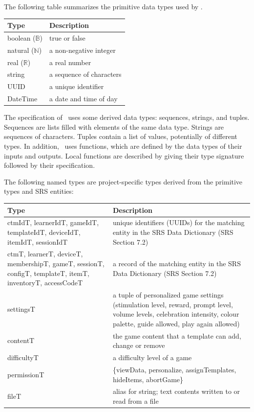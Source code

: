 \documentclass[12pt, titlepage]{article}
\begin{document}
The following table summarizes the primitive data types used by \progname.

\begin{center}
\renewcommand{\arraystretch}{1.2}
\begin{tabular}{p{3cm} p{10cm}}
\hline
\textbf{Type} & \textbf{Description} \\
\hline
boolean ($\mathbb{B}$) & true or false \\
natural ($\mathbb{N}$) & a non-negative integer \\
real ($\mathbb{R}$) & a real number \\
string & a sequence of characters \\
UUID & a unique identifier \\
DateTime & a date and time of day \\
\hline
\end{tabular}
\end{center}

\noindent
The specification of \progname \ uses some derived data types: sequences, strings, and
tuples. Sequences are lists filled with elements of the same data type. Strings
are sequences of characters. Tuples contain a list of values, potentially of
different types. In addition, \progname \ uses functions, which
are defined by the data types of their inputs and outputs. Local functions are
described by giving their type signature followed by their specification.

The following named types are project-specific types derived from the primitive
types and SRS entities:

\begin{center}
\renewcommand{\arraystretch}{1.2}
\begin{tabular}{p{4cm} p{9cm}}
\hline
\textbf{Type} & \textbf{Description} \\
\hline
ctmIdT, learnerIdT, gameIdT, templateIdT, deviceIdT, itemIdT, sessionIdT & unique identifiers (UUIDs) for the matching entity in the SRS Data Dictionary (SRS Section 7.2) \\
ctmT, learnerT, deviceT, membershipT, gameT, sessionT, configT, templateT, itemT, inventoryT, accessCodeT & a record of the matching entity in the SRS Data Dictionary (SRS Section 7.2) \\
settingsT & a tuple of personalized game settings (stimulation level, reward, prompt level, volume levels, celebration intensity, colour palette, guide allowed, play again allowed) \\
contentT & the game content that a template can add, change or remove \\
difficultyT & a difficulty level of a game \\
permissionT & \{viewData, personalize, assignTemplates, hideItems, abortGame\} \\
fileT & alias for string; text contents written to or read from a file \\
\hline
\end{tabular}
\end{center}
\end{document}
